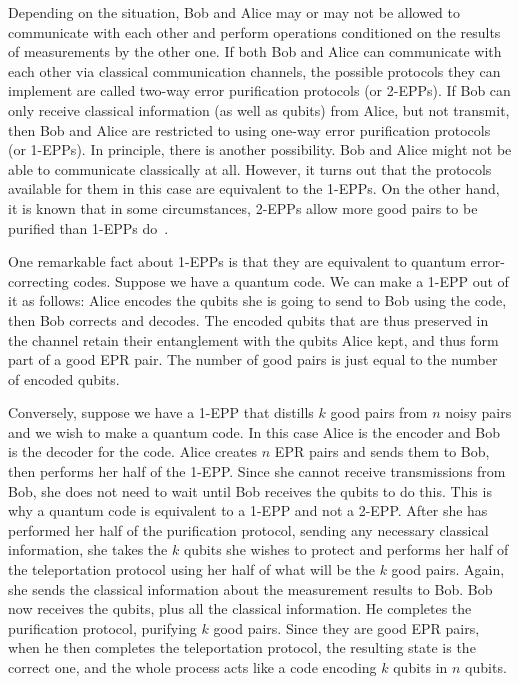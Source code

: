 \documentclass{report}
\begin{document}
Depending on the situation, Bob and Alice may or may not be allowed to 
communicate with each other and perform operations conditioned on the 
results of measurements by the other one.  If both Bob and Alice can 
communicate with each other via classical communication channels, the 
possible protocols they can implement are called two-way error purification 
protocols (or 2-EPPs).  If Bob can only receive classical information (as well 
as qubits) from Alice, but not transmit, then Bob and Alice are restricted to 
using one-way error purification protocols (or 1-EPPs).  In principle, there is 
another possibility.  Bob and Alice might not be able to communicate 
classically at all.  However, it turns out that the protocols available for 
them in this case are equivalent to the 1-EPPs.  On the other hand, it is 
known that in some circumstances, 2-EPPs allow more good pairs to be 
purified than 1-EPPs do~\cite{bennett-tome}.

One remarkable fact about 1-EPPs is that they are equivalent to 
quantum error-correcting codes.  Suppose we have a quantum code.  We 
can make a 1-EPP out of it as follows: Alice encodes the qubits she is going 
to send to Bob using the code, then Bob corrects and decodes.  The encoded 
qubits that are thus preserved in the channel retain their entanglement 
with the qubits Alice kept, and thus form part of a good EPR pair.  The 
number of good pairs is just equal to the number of encoded qubits.

Conversely, suppose we have a 1-EPP that distills $k$ good pairs from $n$ 
noisy pairs and we wish to make a quantum code.  In this case Alice is the 
encoder and Bob is the decoder for the code.  Alice creates $n$ EPR pairs 
and sends them to Bob, then performs her half of the 1-EPP.  Since she 
cannot receive transmissions from Bob, she does not need to wait until Bob 
receives the qubits to do this.  This is why a quantum code is equivalent to 
a 1-EPP and not a 2-EPP.  After she has performed her half of the 
purification protocol, sending any necessary classical information, she 
takes the $k$ qubits she wishes to protect and performs her half of the 
teleportation protocol using her half of what will be the $k$ good pairs.  
Again, she sends the classical information about the measurement results 
to Bob.  Bob now receives the qubits, plus all the classical information.  He 
completes the purification protocol, purifying $k$ good pairs.  Since they 
are good EPR pairs, when he then completes the teleportation protocol, the 
resulting state is the correct one, and the whole process acts like a code 
encoding $k$ qubits in $n$ qubits.
\end{document}
